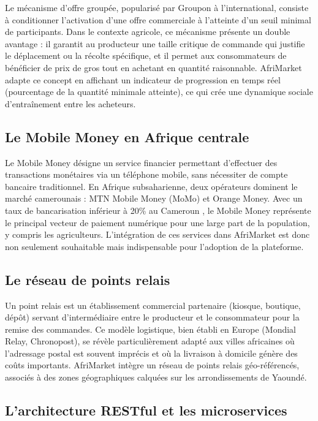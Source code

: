 \documentclass[12pt, a4paper, oneside]{report}
\begin{document}
Le mécanisme d'offre groupée, popularisé par Groupon à l'international, consiste à
conditionner l'activation d'une offre commerciale à l'atteinte d'un seuil minimal de
participants. Dans le contexte agricole, ce mécanisme présente un double avantage : il
garantit au producteur une taille critique de commande qui justifie le déplacement ou la
récolte spécifique, et il permet aux consommateurs de bénéficier de prix de gros tout en
achetant en quantité raisonnable. AfriMarket adapte ce concept en affichant un indicateur
de progression en temps réel (pourcentage de la quantité minimale atteinte), ce qui crée
une dynamique sociale d'entraînement entre les acheteurs.

\subsection{Le Mobile Money en Afrique centrale}

Le Mobile Money désigne un service financier permettant d'effectuer des transactions
monétaires via un téléphone mobile, sans nécessiter de compte bancaire traditionnel. En
Afrique subsaharienne, deux opérateurs dominent le marché camerounais : MTN Mobile Money
(MoMo) et Orange Money. Avec un taux de bancarisation inférieur à 20\% au Cameroun
\cite{banquemondiale2023}, le Mobile Money représente le principal vecteur de paiement
numérique pour une large part de la population, y compris les agriculteurs. L'intégration
de ces services dans AfriMarket est donc non seulement souhaitable mais indispensable pour
l'adoption de la plateforme.

\subsection{Le réseau de points relais}

Un point relais est un établissement commercial partenaire (kiosque, boutique, dépôt)
servant d'intermédiaire entre le producteur et le consommateur pour la remise des
commandes. Ce modèle logistique, bien établi en Europe (Mondial Relay, Chronopost), se
révèle particulièrement adapté aux villes africaines où l'adressage postal est souvent
imprécis et où la livraison à domicile génère des coûts importants. AfriMarket intègre un
réseau de points relais géo-référencés, associés à des zones géographiques calquées sur les
arrondissements de Yaoundé.

\subsection{L'architecture RESTful et les microservices}
\end{document}
